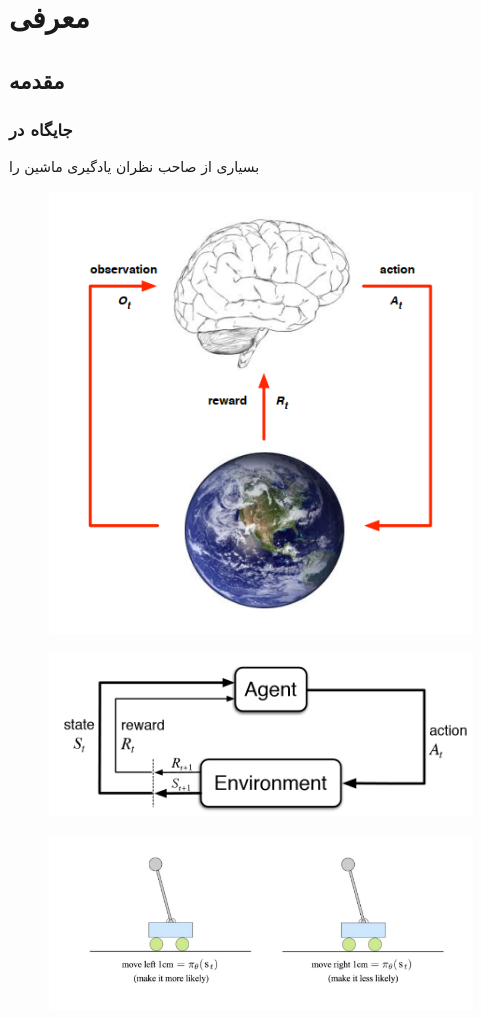 \chapter{معرفی }
\section{مقدمه}
\subsection{جایگاه  در }
بسیاری از صاحب نظران یادگیری ماشین را 
\begin{figure}
	\centering
	\includegraphics[width=0.7\linewidth]{Figures/RL/Enviroment-brain-as-agent}
	\caption{}
	\label{fig:enviroment-brain-as-agent}
\end{figure}
\begin{figure}
	\centering
	\includegraphics[width=0.7\linewidth]{Figures/RL/Markov-vhain-SARSA}
	\caption{}
	\label{fig:markov-vhain-sarsa}
\end{figure}
\begin{figure}
	\centering
	\includegraphics[width=0.7\linewidth]{Figures/RL/RL-cartpole}
	\caption{}
	\label{fig:rl-cartpole}
\end{figure}
